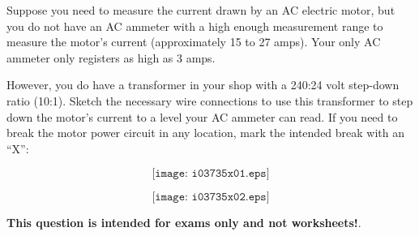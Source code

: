 

Suppose you need to measure the current drawn by an AC electric motor, but you do not have an AC ammeter with a high enough measurement range to measure the motor's current (approximately 15 to 27 amps).  Your only AC ammeter only registers as high as 3 amps.

However, you do have a transformer in your shop with a 240:24 volt step-down ratio (10:1).  Sketch the necessary wire connections to use this transformer to step down the motor's current to a level your AC ammeter can read.  If you need to break the motor power circuit in any location, mark the intended break with an ``X'':

$$\texttt{[image: i03735x01.eps]}$$







$$\texttt{[image: i03735x02.eps]}$$







{\bf This question is intended for exams only and not worksheets!}.


